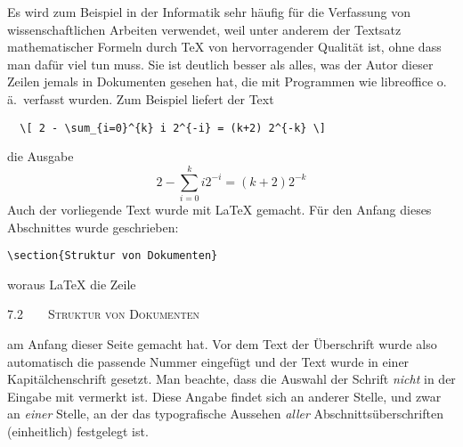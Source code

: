 Es wird zum Beispiel in der Informatik sehr häufig für die Verfassung von
wissenschaftlichen Arbeiten verwendet, weil unter anderem der Textsatz
mathematischer Formeln durch \TeX{} von hervorragender Qualität ist, ohne dass
man dafür viel tun muss. Sie ist deutlich besser als alles, was der Autor
dieser Zeilen jemals in Dokumenten gesehen hat, die mit Programmen wie \zB
libreoffice o.\,ä.\ verfasst wurden. Zum Beispiel liefert der Text
\begin{verbatim}
  \[ 2 - \sum_{i=0}^{k} i 2^{-i} = (k+2) 2^{-k} \]
\end{verbatim}
die Ausgabe
  \[ 2 - \sum_{i=0}^{k} i 2^{-i} = (k+2) 2^{-k} \]
%
Auch der vorliegende Text wurde mit \LaTeX{} gemacht. Für den Anfang
dieses Abschnittes wurde \zB geschrieben:

\verb|\section{Struktur von Dokumenten}|\hfill

\noindent
woraus \LaTeX{} die Zeile

{\large 7.2\ \ \ \ \textsc{Struktur von Dokumenten}}

\noindent
am Anfang dieser Seite gemacht hat.  Vor dem Text der Überschrift wurde also
automatisch die passende Nummer eingefügt und der Text wurde in einer
Kapitälchenschrift gesetzt. Man beachte, dass \zB die Auswahl der Schrift
\emph{nicht} in der Eingabe mit vermerkt ist. Diese Angabe findet sich an
anderer Stelle, und zwar an \emph{einer} Stelle, an der das typografische
Aussehen \emph{aller} Abschnittsüberschriften (einheitlich) festgelegt ist.

